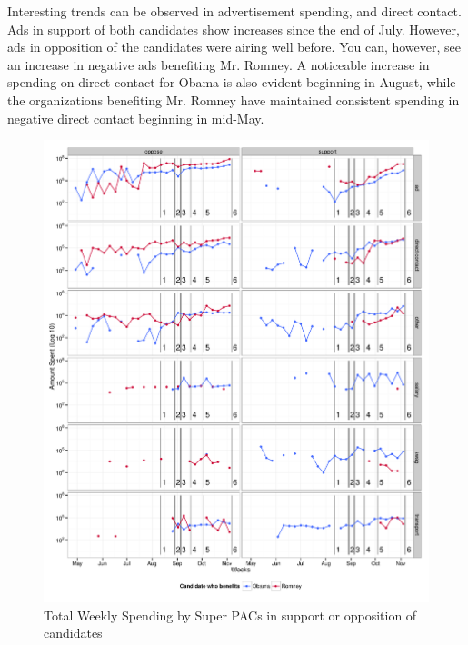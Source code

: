 \documentclass[11pt]{article}\usepackage{graphicx, color}
\newenvironment{knitrout}{}{} %
\begin{document}
Interesting trends can be observed in advertisement spending, and direct contact. Ads in support of both candidates show increases since the end of July. However, ads in opposition of the candidates were airing well before. You can, however, see an increase in negative ads benefiting Mr. Romney. A noticeable increase in spending on direct contact for Obama is also evident beginning in August, while the organizations benefiting Mr. Romney have maintained consistent spending in negative direct contact beginning in mid-May.

\begin{knitrout}
\color{fgcolor}\begin{figure}[H]


{\centering \includegraphics[width=\textwidth]{figure/temporal_plot} 

}

\caption[Total Weekly Spending by Super PACs in support or opposition of candidates]{Total Weekly Spending by Super PACs in support or opposition of candidates\label{fig:temporal_plot}}
\end{figure}

\end{knitrout}
\end{document}
